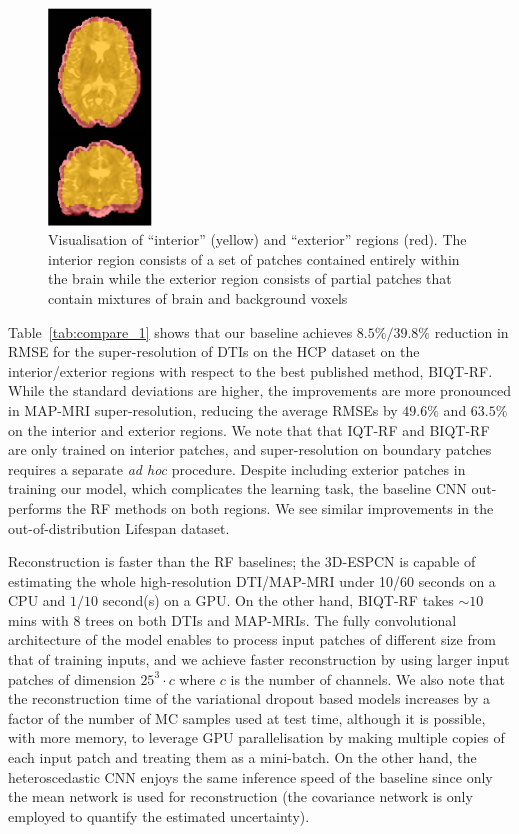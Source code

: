\begin{figure}[t]
	\centering
	\includegraphics[width=2.75cm]{chapter_3/figures/fig_3_2.png}
	\small
	\caption{\footnotesize Visualisation of ``interior'' (yellow) and ``exterior'' regions (red). The interior region consists of a set of patches contained entirely within the brain while the exterior region consists of partial patches that contain mixtures of brain and background voxels} 
	\label{fig:mask}
\end{figure}

Table~\ref{tab:compare_1} shows that our baseline achieves $8.5\%/39.8\%$ reduction in RMSE for the super-resolution of DTIs on the HCP dataset on the interior/exterior regions with respect to the best published method, BIQT-RF\cite{tanno2016bayesian}. While the standard deviations are higher, the improvements are more pronounced in MAP-MRI super-resolution, reducing the average RMSEs by $49.6\%$ and $63.5\%$ on the interior and exterior regions. We note that that IQT-RF and BIQT-RF are only trained on interior patches, and super-resolution on boundary patches requires a separate \textit{ad hoc} procedure. Despite including exterior patches in training our model, which complicates the learning task, the baseline CNN out-performs the RF methods on both regions. We see similar improvements in the out-of-distribution Lifespan dataset.

Reconstruction is faster than the RF baselines; the 3D-ESPCN is capable of estimating the whole high-resolution DTI/MAP-MRI under 10/60 seconds on a CPU and $1/10$ second(s) on a GPU. On the other hand, BIQT-RF takes $\sim10$ mins with 8 trees on both DTIs and MAP-MRIs. The fully convolutional architecture of the model enables to process input patches of different size from that of training inputs, and we achieve faster reconstruction by using larger input patches of dimension $25^3\cdot c$ where $c$ is the number of channels. We also note that the reconstruction time of the variational dropout based models increases by a factor of the number of MC samples used at test time, although it is possible, with more memory, to leverage GPU parallelisation by making multiple copies of each input patch and treating them as a mini-batch. On the other hand, the heteroscedastic CNN enjoys the same inference speed of the baseline since only the mean network is used for reconstruction (the covariance network is only employed to quantify the estimated  uncertainty). 

